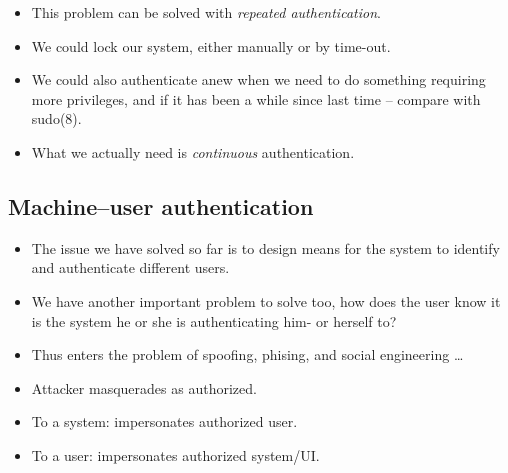 \begin{frame}
  \begin{solution}
    \begin{itemize}
      \item This problem can be solved with \emph{repeated authentication}.

      \item We could lock our system, either manually or by time-out.

      \item We could also authenticate anew when we need to do something 
        requiring more privileges, and if it has been a while since last time -- 
        compare with sudo(8).
    \end{itemize}
  \end{solution}

  \pause{}

  \begin{remark}
    \begin{itemize}
      \item What we actually need is \emph{continuous} authentication.
    \end{itemize}
  \end{remark}
\end{frame}

\subsection{Machine--user authentication}

\begin{frame}
  \begin{remark}
    \begin{itemize}
      \item The issue we have solved so far is to design means for the system to 
        identify and authenticate different users.

      \item We have another important problem to solve too, how does the user 
        know it is the system he or she is authenticating him- or herself to?

      \item Thus enters the problem of spoofing, phising, and social engineering 
        \dots
    \end{itemize}
  \end{remark}
\end{frame}

\begin{frame}
  \begin{definition}
    \begin{itemize}
      \item Attacker masquerades as authorized.
      \item To a system: impersonates authorized user.
      \item To a user: impersonates authorized system/UI.
    \end{itemize}
  \end{definition}
\end{frame}


